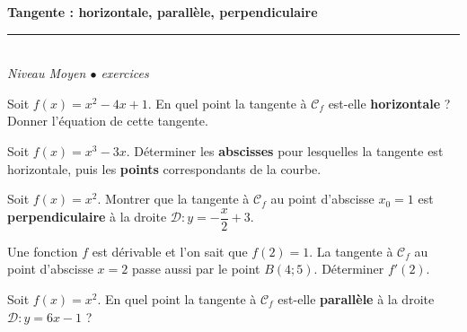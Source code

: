 \documentclass[11pt,a4paper]{article}
\begin{document}
\begin{center}
{\LARGE\bfseries\color{primarydark} Tangente : horizontale, parallèle, perpendiculaire}\\[2pt]
{\color{primary}\rule{0.5\textwidth}{1.2pt}}\\[4pt]
{\small\itshape Niveau Moyen \quad$\bullet$ exercices}
\end{center}
\vspace{2mm}

\begin{exo}[1]
Soit $f(x)=x^2-4x+1$. En quel point la tangente à $\mathcal{C}_f$ est-elle \textbf{horizontale} ? Donner l'équation de cette tangente.
\end{exo}

\begin{exo}[2]
Soit $f(x)=x^3-3x$. Déterminer les \textbf{abscisses} pour lesquelles la tangente est horizontale, puis les \textbf{points} correspondants de la courbe.
\end{exo}

\begin{exo}[3]
Soit $f(x)=x^2$. Montrer que la tangente à $\mathcal{C}_f$ au point d'abscisse $x_0=1$ est \textbf{perpendiculaire} à la droite $\mathcal{D}:y=-\dfrac{x}{2}+3$.
\end{exo}

\begin{exo}[4]
Une fonction $f$ est dérivable et l'on sait que $f(2)=1$. La tangente à $\mathcal{C}_f$ au point d'abscisse $x=2$ passe aussi par le point $B(4;5)$. Déterminer $f'(2)$.
\end{exo}

\begin{exo}[5]
Soit $f(x)=x^2$. En quel point la tangente à $\mathcal{C}_f$ est-elle \textbf{parallèle} à la droite $\mathcal{D}:y=6x-1$ ?
\end{exo}
\end{document}
